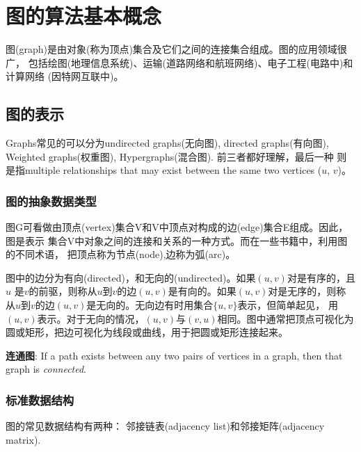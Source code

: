


\chapter{图的算法基本概念}
\label{chap:graph-primer}

图(graph)是由对象(称为顶点)集合及它们之间的连接集合组成。图的应用领域很广，
包括绘图(地理信息系统)、运输(道路网络和航班网络)、电子工程(电路中)和计算网络
(因特网互联中)。


% 
% 
\section{图的表示}
\label{intro:sec:graph:presentation}

Graphs常见的可以分为undirected graphs(无向图), directed graphs(有向图),
Weighted graphs(权重图), Hypergraphs(混合图). 前三者都好理解，最后一种
则是指multiple relationships that may exist between the same two vertices
($u$, $v$)。

\subsection{图的抽象数据类型}
图G可看做由顶点(vertex)集合V和V中顶点对构成的边(edge)集合E组成。因此，图是表示
集合V中对象之间的连接和关系的一种方式。而在一些书籍中，利用图的不同术语，
把顶点称为节点(node),边称为弧(arc)。

图中的边分为有向(directed)，和无向的(undirected)。如果$(u,v)$对是有序的，且$u$
是$v$的前驱，则称从$u$到$v$的边$(u,v)$是有向的。如果$(u,v)$对是无序的，则称
从$u$到$v$的边$(u,v)$是无向的。无向边有时用集合$\{u,v\}$表示，但简单起见，
用$(u,v)$表示。对于无向的情况，$(u,v)$与$(v,u)$相同。图中通常把顶点可视化为
圆或矩形，把边可视化为线段或曲线，用于把圆或矩形连接起来。

\textbf{连通图}: If a path exists between any two pairs of vertices in a 
graph, then that graph is \textit{connected}.
% 
% 
\subsection{标准数据结构}
\label{sec:standard_data_structures}
图的常见数据结构有两种：
邻接链表(adjacency list)和邻接矩阵(adjacency matrix).

